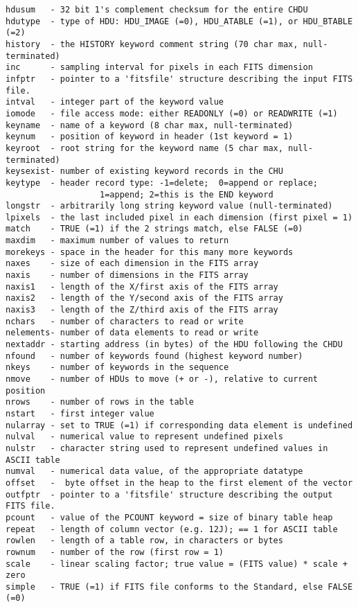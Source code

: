 \begin{verbatim}
hdusum   - 32 bit 1's complement checksum for the entire CHDU
hdutype  - type of HDU: HDU_IMAGE (=0), HDU_ATABLE (=1), or HDU_BTABLE (=2)
history  - the HISTORY keyword comment string (70 char max, null-terminated)
inc      - sampling interval for pixels in each FITS dimension
infptr   - pointer to a 'fitsfile' structure describing the input FITS file.
intval   - integer part of the keyword value
iomode   - file access mode: either READONLY (=0) or READWRITE (=1)
keyname  - name of a keyword (8 char max, null-terminated)
keynum   - position of keyword in header (1st keyword = 1)
keyroot  - root string for the keyword name (5 char max, null-terminated)
keysexist- number of existing keyword records in the CHU
keytype  - header record type: -1=delete;  0=append or replace;
                   1=append; 2=this is the END keyword
longstr  - arbitrarily long string keyword value (null-terminated)
lpixels  - the last included pixel in each dimension (first pixel = 1)
match    - TRUE (=1) if the 2 strings match, else FALSE (=0)
maxdim   - maximum number of values to return
morekeys - space in the header for this many more keywords
naxes    - size of each dimension in the FITS array
naxis    - number of dimensions in the FITS array
naxis1   - length of the X/first axis of the FITS array
naxis2   - length of the Y/second axis of the FITS array
naxis3   - length of the Z/third axis of the FITS array
nchars   - number of characters to read or write
nelements- number of data elements to read or write
nextaddr - starting address (in bytes) of the HDU following the CHDU
nfound   - number of keywords found (highest keyword number)
nkeys    - number of keywords in the sequence
nmove    - number of HDUs to move (+ or -), relative to current position
nrows    - number of rows in the table
nstart   - first integer value
nularray - set to TRUE (=1) if corresponding data element is undefined
nulval   - numerical value to represent undefined pixels
nulstr   - character string used to represent undefined values in ASCII table
numval   - numerical data value, of the appropriate datatype
offset   -  byte offset in the heap to the first element of the vector
outfptr  - pointer to a 'fitsfile' structure describing the output FITS file.
pcount   - value of the PCOUNT keyword = size of binary table heap
repeat   - length of column vector (e.g. 12J); == 1 for ASCII table
rowlen   - length of a table row, in characters or bytes
rownum   - number of the row (first row = 1)
scale    - linear scaling factor; true value = (FITS value) * scale + zero
simple   - TRUE (=1) if FITS file conforms to the Standard, else FALSE (=0)

\end{verbatim}
